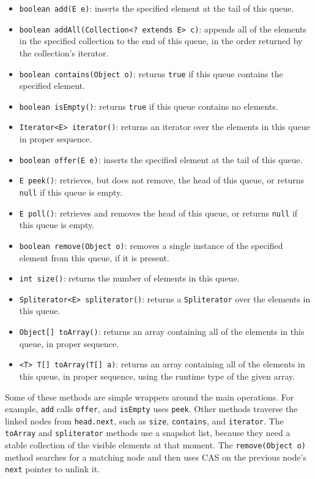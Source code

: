 \begin{itemize}
\item \texttt{boolean add(E e)}: inserts the specified element at the tail of this queue.
\item \texttt{boolean addAll(Collection<? extends E> c)}: appends all of the elements in the specified collection to the end of this queue, in the order returned by the collection's iterator.
\item \texttt{boolean contains(Object o)}: returns \texttt{true} if this queue contains the specified element.
\item \texttt{boolean isEmpty()}: returns \texttt{true} if this queue contains no elements.
\item \texttt{Iterator<E> iterator()}: returns an iterator over the elements in this queue in proper sequence.
\item \texttt{boolean offer(E e)}: inserts the specified element at the tail of this queue.
\item \texttt{E peek()}: retrieves, but does not remove, the head of this queue, or returns \texttt{null} if this queue is empty.
\item \texttt{E poll()}: retrieves and removes the head of this queue, or returns \texttt{null} if this queue is empty.
\item \texttt{boolean remove(Object o)}: removes a single instance of the specified element from this queue, if it is present.
\item \texttt{int size()}: returns the number of elements in this queue.
\item \texttt{Spliterator<E> spliterator()}: returns a \texttt{Spliterator} over the elements in this queue.
\item \texttt{Object[] toArray()}: returns an array containing all of the elements in this queue, in proper sequence.
\item \texttt{<T> T[] toArray(T[] a)}: returns an array containing all of the elements in this queue, in proper sequence, using the runtime type of the given array.
\end{itemize}

Some of these methods are simple wrappers around the main operations. For example, \texttt{add} calls \texttt{offer}, and \texttt{isEmpty} uses \texttt{peek}. Other methods traverse the linked nodes from \texttt{head.next}, such as \texttt{size}, \texttt{contains}, and \texttt{iterator}. The \texttt{toArray} and \texttt{spliterator} methods use a snapshot list, because they need a stable collection of the visible elements at that moment. The \texttt{remove(Object o)} method searches for a matching node and then uses CAS on the previous node's \texttt{next} pointer to unlink it.

